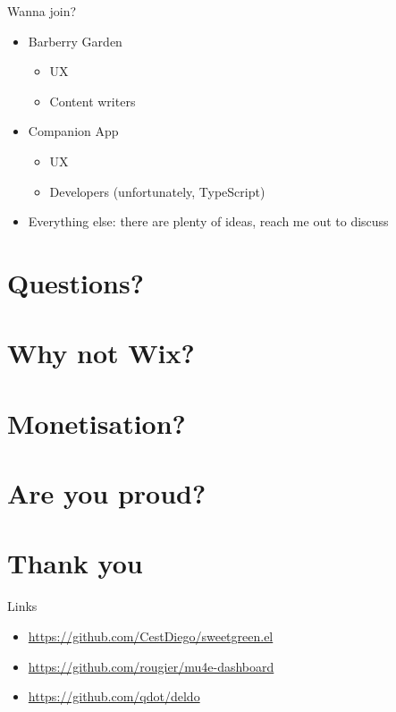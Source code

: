\documentclass[presentation,aspectratio=169,smaller]{beamer}
\begin{document}
\begin{frame}[label={sec:orgde94e3e}]{Wanna join?}
\begin{itemize}
\item Barberry Garden
\begin{itemize}
\item UX
\item Content writers
\end{itemize}
\item Companion App
\begin{itemize}
\item UX
\item Developers (unfortunately, TypeScript)
\end{itemize}
\item Everything else: there are plenty of ideas, reach me out to discuss
\end{itemize}
\end{frame}

\section{Questions?}
\label{sec:orgd066ea8}

\section{Why not Wix?}
\label{sec:org269d901}

\section{Monetisation?}
\label{sec:org31beebd}

\section{Are you proud?}
\label{sec:org15dc042}

\section{Thank you}
\label{sec:orgbbbfa54}

\begin{frame}[label={sec:org73142f0}]{Links}
\begin{itemize}
\item \url{https://github.com/CestDiego/sweetgreen.el}
\item \url{https://github.com/rougier/mu4e-dashboard}
\item \url{https://github.com/qdot/deldo}
\end{itemize}
\end{frame}
\end{document}
